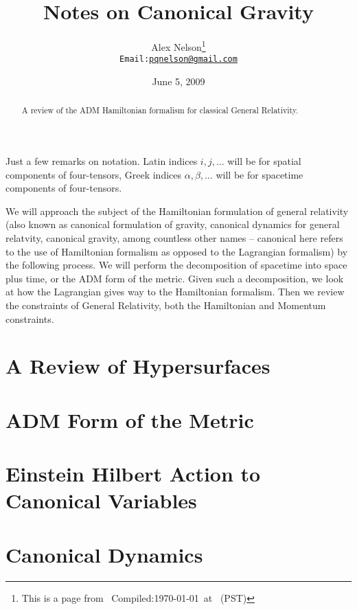 \documentclass{article}
\title{Notes on Canonical Gravity}
\date{June 5, 2009}
\author{Alex Nelson\thanks{This is a page from \homeurl{}\hfil\break\indent\;\, Compiled:\enspace\today\ at \currenttime\ (PST)}\\\texttt{Email:\enspace\href{mailto:pqnelson@gmail.com}{pqnelson@gmail.com}}}
\numberwithin{equation}{section}
\begin{document}
\maketitle
\tableofcontents
\begin{abstract}
A review of the ADM Hamiltonian formalism for classical General
Relativity.
\end{abstract}
\bigbreak
Just a few remarks on notation. Latin indices $i,j,\ldots$ will
be for spatial components of four-tensors, Greek indices
$\alpha,\beta,\ldots$ will be for spacetime components of
four-tensors.

We will approach the subject of the Hamiltonian formulation of
general relativity (also known as canonical formulation of
gravity, canonical dynamics for general relatvity, canonical
gravity, among countless other names -- canonical here refers to
the use of Hamiltonian formalism as opposed to the Lagrangian
formalism) by the following process. %
We will perform the decomposition of spacetime into space
plus time, or the ADM form of the metric. Given such a
decomposition, we look at how the Lagrangian gives way to the
Hamiltonian formalism. Then we review the constraints of General
Relativity, both the Hamiltonian and Momentum constraints.

\section{A Review of Hypersurfaces}

\section{ADM Form of the Metric}

\section{Einstein Hilbert Action to Canonical Variables}

\section{Canonical Dynamics}


\nocite{*}
\footnotesize

\end{document}
